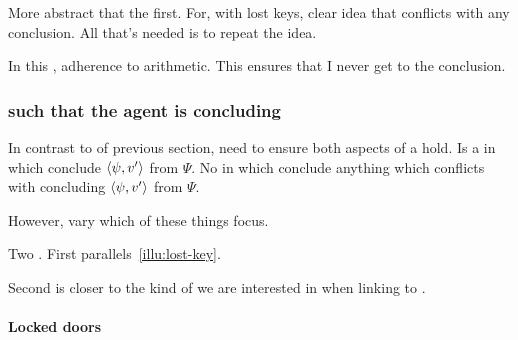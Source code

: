 \begin{note}
  More abstract that the first.
  For, with lost keys, clear idea that conflicts with any conclusion.
  All that's needed is to repeat the idea.

  In this , adherence to arithmetic.
  This ensures that I never get to the conclusion.
\end{note}

\subsubsection{ such that the agent is concluding}

\begin{note}
  In contrast to  of previous section, need to ensure both aspects of a  hold.
  Is a  \pevent{} in which conclude \(\langle \psi, v' \rangle\) from \(\Psi\).
  No \pevent{} in which conclude anything which conflicts with concluding \(\langle \psi, v' \rangle\) from \(\Psi\).

  However, vary which of these things focus.
\end{note}

\begin{note}
  Two .
  First parallels~\autoref{illu:lost-key}.

  Second is closer to the kind of  we are interested in when linking  to \issueConstraint{}.
\end{note}

\paragraph*{Locked doors}

